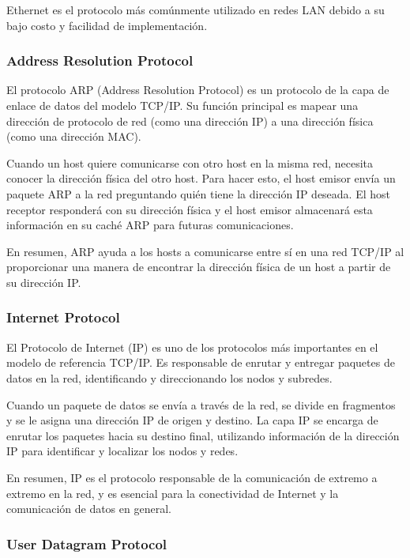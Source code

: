 Ethernet es el protocolo más comúnmente utilizado en redes LAN debido a su bajo costo y facilidad de implementación.


\subsubsection{Address Resolution Protocol}

El protocolo ARP (Address Resolution Protocol) es un protocolo de la capa de enlace de datos del modelo TCP/IP. Su función principal es mapear una dirección de protocolo de red (como una dirección IP) a una dirección física (como una dirección MAC).

Cuando un host quiere comunicarse con otro host en la misma red, necesita conocer la dirección física del otro host. Para hacer esto, el host emisor envía un paquete ARP a la red preguntando quién tiene la dirección IP deseada. El host receptor responderá con su dirección física y el host emisor almacenará esta información en su caché ARP para futuras comunicaciones.

En resumen, ARP ayuda a los hosts a comunicarse entre sí en una red TCP/IP al proporcionar una manera de encontrar la dirección física de un host a partir de su dirección IP.


\subsubsection{Internet Protocol}

El Protocolo de Internet (IP) es uno de los protocolos más importantes en el modelo de referencia TCP/IP. Es responsable de enrutar y entregar paquetes de datos en la red, identificando y direccionando los nodos y subredes.

Cuando un paquete de datos se envía a través de la red, se divide en fragmentos y se le asigna una dirección IP de origen y destino. La capa IP se encarga de enrutar los paquetes hacia su destino final, utilizando información de la dirección IP para identificar y localizar los nodos y redes.

En resumen, IP es el protocolo responsable de la comunicación de extremo a extremo en la red, y es esencial para la conectividad de Internet y la comunicación de datos en general.

\newpage
\subsubsection{User Datagram Protocol}

